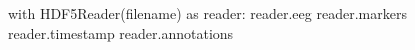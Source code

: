 \begin{python}
with HDF5Reader(filename) as reader:
    reader.eeg         
    reader.markers      
    reader.timestamp    
    reader.annotations 
\end{python}